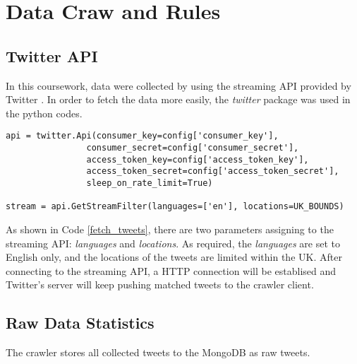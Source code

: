 \section{Data Craw and Rules}

\subsection{Twitter API}

In this coursework, data were collected by using the streaming API provided by Twitter \cite{twitter_streaming}. In order to fetch the data more easily, the \textit{twitter} package was used in the python codes.


\begin{lstlisting}[caption={Fetch Tweets},captionpos=b,label={fetch_tweets}]
api = twitter.Api(consumer_key=config['consumer_key'],
                consumer_secret=config['consumer_secret'],
                access_token_key=config['access_token_key'],
                access_token_secret=config['access_token_secret'],
                sleep_on_rate_limit=True)

stream = api.GetStreamFilter(languages=['en'], locations=UK_BOUNDS)
\end{lstlisting}

As shown in Code \ref{fetch_tweets}, there are two parameters assigning to the streaming API: \textit{languages} and \textit{locations}. As required, the \textit{languages} are set to English only, and the locations of the tweets are limited within the UK. After connecting to the streaming API, a HTTP connection will be establised and Twitter's server will keep pushing matched tweets to the crawler client.

\subsection{Raw Data Statistics}
The crawler stores all collected tweets to the MongoDB as raw tweets. 
